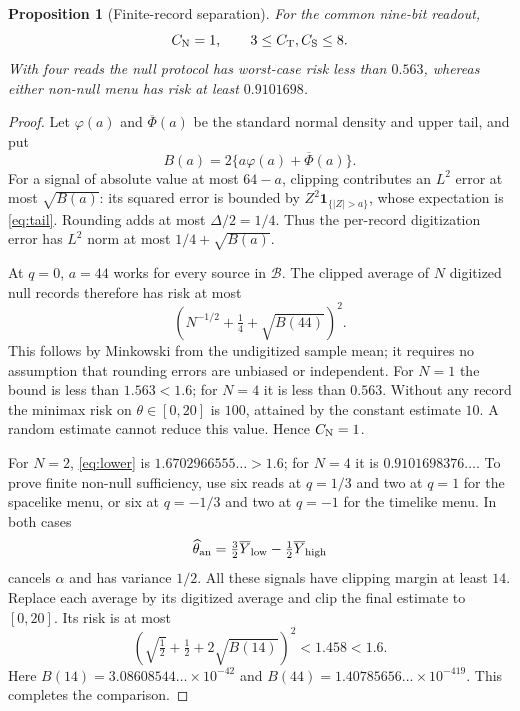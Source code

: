 \documentclass[12pt,a4paper]{article}
\newtheorem{proposition}[theorem]{Proposition}
\theoremstyle{definition}
\begin{document}
\begin{proposition}[Finite-record separation]
\label{prop:finite}
For the common nine-bit readout,
\begin{equation}
 C_{\rm N}=1,\qquad 3\leq C_{\rm T},C_{\rm S}\leq8.
 \label{eq:cost}
\end{equation}
With four reads the null protocol has worst-case risk less than $0.563$,
whereas either non-null menu has risk at least $0.9101698$.
\end{proposition}

\begin{proof}
Let $\varphi(a)$ and $\overline\Phi(a)$ be the standard normal density
and upper tail, and put
\begin{equation}
 B(a)=2\{a\varphi(a)+\overline\Phi(a)\}.
 \label{eq:tail}
\end{equation}
For a signal of absolute value at most $64-a$, clipping contributes an
$L^2$ error at most $\sqrt{B(a)}$: its squared error is bounded by
$Z^2\mathbf1_{\{|Z|>a\}}$, whose expectation is \eqref{eq:tail}.
Rounding adds at most $\Delta/2=1/4$. Thus the per-record digitization
error has $L^2$ norm at most $1/4+\sqrt{B(a)}$.

At $q=0$, $a=44$ works for every source in $\mathcal B$. The clipped
average of $N$ digitized null records therefore has risk at most
\begin{equation}
 \left(N^{-1/2}+\tfrac14+\sqrt{B(44)}\right)^2.
 \label{eq:nullupper}
\end{equation}
This follows by Minkowski from the undigitized sample mean; it requires
no assumption that rounding errors are unbiased or independent. For
$N=1$ the bound is less than $1.563<1.6$; for $N=4$ it is less than
$0.563$. Without any record the minimax risk on $\theta\in[0,20]$ is
$100$, attained by the constant estimate $10$. A random estimate cannot
reduce this value. Hence $C_{\rm N}=1$.

For $N=2$, \eqref{eq:lower} is $1.6702966555\ldots>1.6$; for $N=4$
it is $0.9101698376\ldots$. To prove finite non-null sufficiency, use six
reads at $q=1/3$ and two at $q=1$ for the spacelike menu, or six at
$q=-1/3$ and two at $q=-1$ for the timelike menu. In both cases
\begin{equation}
 \widehat\theta_{\rm an}=\tfrac32\overline Y_{\rm low}
                         -\tfrac12\overline Y_{\rm high}
 \label{eq:endpoint}
\end{equation}
cancels $\alpha$ and has variance $1/2$. All these signals have clipping
margin at least $14$. Replace each average by its digitized average and
clip the final estimate to $[0,20]$. Its risk is at most
\begin{equation}
 \left(\sqrt{\tfrac12}+\tfrac12+2\sqrt{B(14)}\right)^2
 <1.458<1.6.
 \label{eq:nonnullupper}
\end{equation}
Here $B(14)=3.08608544\ldots\times10^{-42}$ and
$B(44)=1.40785656\ldots\times10^{-419}$. This completes the comparison.
\end{proof}
\end{document}
